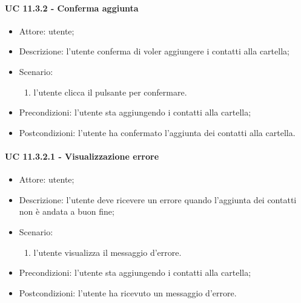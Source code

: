     \paragraph{UC 11.3.2 - Conferma aggiunta}
    \begin{itemize}
        \item Attore: utente;
        \item Descrizione: l'utente conferma di voler aggiungere i contatti alla cartella;
        \item Scenario:
        \begin{enumerate}
        \item l'utente clicca il pulsante per confermare.
        \end{enumerate}
        \item Precondizioni: l'utente sta aggiungendo i contatti alla cartella;
        \item Postcondizioni: l'utente ha confermato l'aggiunta dei contatti alla cartella.
    \end{itemize}
    \paragraph{UC 11.3.2.1 - Visualizzazione errore}
    \begin{itemize}
        \item Attore: utente;
        \item Descrizione: l'utente deve ricevere un errore quando l'aggiunta dei contatti non è andata a buon fine;
        \item Scenario:
        \begin{enumerate}
        \item l'utente visualizza il messaggio d'errore.
        \end{enumerate}   
        \item Precondizioni: l'utente sta aggiungendo i contatti alla cartella;
        \item Postcondizioni: l'utente ha ricevuto un messaggio d'errore.
    \end{itemize}
